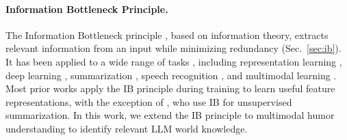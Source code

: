 \paragraph{Information Bottleneck Principle.} The Information Bottleneck principle \cite[IB;][]{ib}, based on information theory, extracts relevant information from an input while minimizing redundancy (Sec.~\ref{sec:ib}). It has been applied to a wide range of tasks \cite{ib-review}, including representation learning \cite{graph-ib, lee2021compressive}, deep learning \cite{michael2018on, icml2023kzxinfodl}, summarization \cite{west-etal-2019-bottlesum, ju-etal-2021-leveraging-information, li-etal-2021-ease}, speech recognition \cite{hecht09c_interspeech}, and multimodal learning \cite{Mai_2023, FangWZHZXW024}. Most prior works apply the IB principle during training to learn useful feature representations, with the exception of \citet{west-etal-2019-bottlesum, ju-etal-2021-leveraging-information}, who use IB for unsupervised summarization. In this work, we extend the IB principle to multimodal humor understanding to identify relevant LLM world knowledge.
